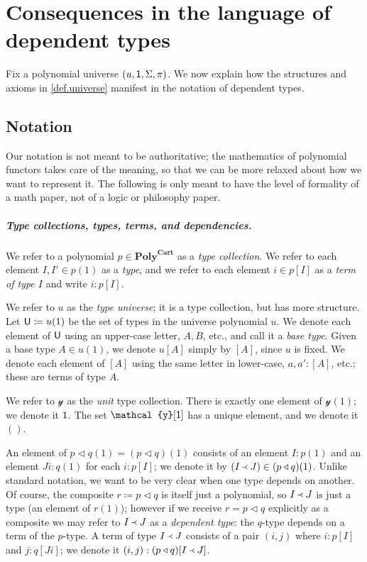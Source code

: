 \documentclass[11pt, one side, article]{memoir}
\theoremstyle{definition}
\theoremstyle{plain}
\newcommand{\Cat}[1]{\mathbf{#1}}%
\newcommand{\tn}[1]{\textnormal{#1}}
\newcommand{\yon}{\mathcal{y}}
\newcommand{\poly}{\Cat{Poly}}
\newcommand{\polycart}{\poly^{\Cat{Cart}}}
\newcommand{\0}{\textsf{0}}
\newcommand{\1}{\tn{\textsf{1}}}
\newcommand{\U}{\tn{\textsf{U}}}
\newcommand{\tri}{\mathbin{\triangleleft}}
\newcommand{\founds}{\Yleft}
\begin{document}
\chapter{Consequences in the language of dependent types}\label{chap.consequences}

Fix a polynomial universe $(u,\1,\Sigma,\pi)$. We now explain how the structures and axioms in \cref{def.universe} manifest in the notation of dependent types. 

\section{Notation}

Our notation is not meant to be authoritative; the mathematics of polynomial functors takes care of the meaning, so that we can be more relaxed about how we want to represent it. The following is only meant to have the level of formality of a math paper, not of a logic or philosophy paper.

\paragraph{Type collections, types, terms, and dependencies.}
We refer to a polynomial $p\in\polycart$ as a \emph{type collection}. We refer to each element $I,I'\in p(1)$ as a \emph{type}, and we refer to each element $i\in p[I]$ as a \emph{term of type $I$} and write $i:p[I]$.

We refer to $u$ as the \emph{type universe}; it is a type collection, but has more structure. Let $\U\coloneqq u(1)$ be the set of types in the universe polynomial $u$. We denote each element of $\U$ using an upper-case letter, $A,B$, etc., and call it a \emph{base type}. Given a base type $A\in u(1)$, we denote $u[A]$ simply by $[A]$, since $u$ is fixed. We denote each element of $[A]$ using the same letter in lower-case, $a,a':[A]$, etc.; these are terms of type $A$.

We refer to $\yon$ as the \emph{unit} type collection. There is exactly one element of $\yon(1)$; we denote it $\1$. The set $\yon[\1]$ has a unique element, and we denote it $()$.

An element of $p\tri q(1)=(p\tri q)(1)$ consists of an element $I:p(1)$ and an element $J i:q(1)$ for each $i:p[I]$; we denote it by $(I\founds J)\in (p\tri q)(1)$. Unlike standard notation, we want to be very clear when one type depends on another. Of course, the composite $r\coloneqq p\tri q$ is itself just a polynomial, so $I\founds J$ is just a type (an element of $r(1)$); however if we receive $r=p\tri q$ explicitly as a composite we may refer to $I\founds J$ as a \emph{dependent type}: the $q$-type depends on a term of the $p$-type. A term of type $I\founds J$ consists of a pair $(i,j)$ where $i:p[I]$ and $j: q[J i]$; we denote it $(i,j):(p\tri q)[I\founds J]$.
\end{document}
